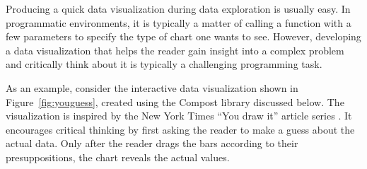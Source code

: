\documentclass[fleqn,11pt]{report}
\theoremstyle{definition}
\begin{document}
Producing a quick data visualization during data exploration is usually easy. In programmatic
environments, it is typically a matter of calling a function with a few parameters to specify
the type of chart one wants to see. However, developing a data visualization that helps
the reader gain insight into a complex problem and critically think about it is typically
a challenging programming task.

As an example, consider the interactive data visualization shown in Figure~\ref{fig:youguess},
created using the Compost library discussed below. The visualization is inspired by the New York
Times ``You draw it'' article series \citep{aisch-2015-youdraw}.
It encourages critical thinking by first asking the reader to make a guess
about the actual data. Only after the reader drags the bars according to their presuppositions, the
chart reveals the actual values.
\end{document}
